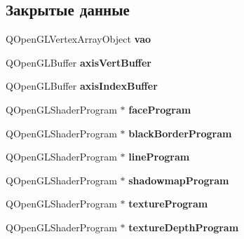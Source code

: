 \subsection*{Закрытые данные}
\begin{DoxyCompactItemize}
\item 
\mbox{\label{class_main_field_a7ba36da0539ea28681fa39952b600a08}} 
Q\+Open\+G\+L\+Vertex\+Array\+Object {\bfseries vao}
\item 
\mbox{\label{class_main_field_ae2dae3cb134a04e167e66f5d83addd81}} 
Q\+Open\+G\+L\+Buffer {\bfseries axis\+Vert\+Buffer}
\item 
\mbox{\label{class_main_field_a8decc9adbacabed6877f341f4301e9ff}} 
Q\+Open\+G\+L\+Buffer {\bfseries axis\+Index\+Buffer}
\item 
\mbox{\label{class_main_field_ad254513cb2498982e856ee2236c81784}} 
Q\+Open\+G\+L\+Shader\+Program $\ast$ {\bfseries face\+Program}
\item 
\mbox{\label{class_main_field_a91d6d393718b8be6169d960a4a2cd427}} 
Q\+Open\+G\+L\+Shader\+Program $\ast$ {\bfseries black\+Border\+Program}
\item 
\mbox{\label{class_main_field_afed5c809c32609bf37ae8896bfea36f0}} 
Q\+Open\+G\+L\+Shader\+Program $\ast$ {\bfseries line\+Program}
\item 
\mbox{\label{class_main_field_a40dea0b270dd7a0a994589907ef873bb}} 
Q\+Open\+G\+L\+Shader\+Program $\ast$ {\bfseries shadowmap\+Program}
\item 
\mbox{\label{class_main_field_af98c8b6a4bf3d52de4088c7773bb41ad}} 
Q\+Open\+G\+L\+Shader\+Program $\ast$ {\bfseries texture\+Program}
\item 
\mbox{\label{class_main_field_ac281654473f56097d37e1ea07642309b}} 
Q\+Open\+G\+L\+Shader\+Program $\ast$ {\bfseries texture\+Depth\+Program}
\item 
\mbox{\label{class_main_field_a4a802d6ffbb48c4cf52ae710f5c7d3fd}} 

\end{DoxyCompactItemize}
